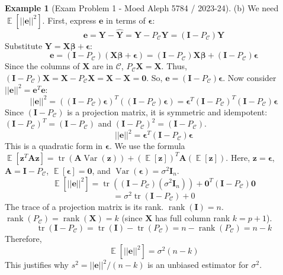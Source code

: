 \documentclass[11pt]{article}
\theoremstyle{definition}
\newtheorem{example}[theorem]{Example}
\theoremstyle{remark}
\DeclareMathOperator{\E}{\mathbb{E}}
\DeclareMathOperator{\Var}{\operatorname{Var}}
\DeclareMathOperator{\tr}{\operatorname{tr}}
\DeclareMathOperator{\rank}{\operatorname{rank}}
\begin{document}
\begin{example}[Exam Problem 1 - Moed Aleph 5784 / 2023-24]
(b) We need $\E[||\bm{e}||^2]$. First, express $\bm{e}$ in terms of $\bm{\epsilon}$:
\[ \bm{e} = \bm{Y} - \hat{\bm{Y}} = \bm{Y} - P_{\mathcal{C}}\bm{Y} = (\bm{I} - P_{\mathcal{C}})\bm{Y} \]
Substitute $\bm{Y} = \bm{X}\bm{\beta} + \bm{\epsilon}$:
\[ \bm{e} = (\bm{I} - P_{\mathcal{C}})(\bm{X}\bm{\beta} + \bm{\epsilon}) = (\bm{I} - P_{\mathcal{C}})\bm{X}\bm{\beta} + (\bm{I} - P_{\mathcal{C}})\bm{\epsilon} \]
Since the columns of $\bm{X}$ are in $\mathcal{C}$, $P_{\mathcal{C}}\bm{X} = \bm{X}$. Thus, $(\bm{I} - P_{\mathcal{C}})\bm{X} = \bm{X} - P_{\mathcal{C}}\bm{X} = \bm{X} - \bm{X} = \mathbf{0}$.
So, $\bm{e} = (\bm{I} - P_{\mathcal{C}})\bm{\epsilon}$.
Now consider $||\bm{e}||^2 = \bm{e}^T\bm{e}$:
\[ ||\bm{e}||^2 = ((\bm{I} - P_{\mathcal{C}})\bm{\epsilon})^T ((\bm{I} - P_{\mathcal{C}})\bm{\epsilon}) = \bm{\epsilon}^T (\bm{I} - P_{\mathcal{C}})^T (\bm{I} - P_{\mathcal{C}}) \bm{\epsilon} \]
Since $(\bm{I} - P_{\mathcal{C}})$ is a projection matrix, it is symmetric and idempotent: $(\bm{I} - P_{\mathcal{C}})^T = (\bm{I} - P_{\mathcal{C}})$ and $(\bm{I} - P_{\mathcal{C}})^2 = (\bm{I} - P_{\mathcal{C}})$.
\[ ||\bm{e}||^2 = \bm{\epsilon}^T (\bm{I} - P_{\mathcal{C}}) \bm{\epsilon} \]
This is a quadratic form in $\bm{\epsilon}$. We use the formula $\E[\bm{z}^T \bm{A} \bm{z}] = \tr(\bm{A} \Var(\bm{z})) + (\E[\bm{z}])^T \bm{A} (\E[\bm{z}])$.
Here, $\bm{z} = \bm{\epsilon}$, $\bm{A} = \bm{I} - P_{\mathcal{C}}$, $\E[\bm{\epsilon}] = \mathbf{0}$, and $\Var(\bm{\epsilon}) = \sigma^2 \bm{I}_n$.
\[ \E[||\bm{e}||^2] = \tr((\bm{I} - P_{\mathcal{C}}) (\sigma^2 \bm{I}_n)) + \mathbf{0}^T (\bm{I} - P_{\mathcal{C}}) \mathbf{0} \]
\[ = \sigma^2 \tr(\bm{I} - P_{\mathcal{C}}) + 0 \]
The trace of a projection matrix is its rank. $\rank(\bm{I}) = n$. $\rank(P_{\mathcal{C}}) = \rank(\bm{X}) = k$ (since $\bm{X}$ has full column rank $k=p+1$).
\[ \tr(\bm{I} - P_{\mathcal{C}}) = \tr(\bm{I}) - \tr(P_{\mathcal{C}}) = n - \rank(P_{\mathcal{C}}) = n - k \]
Therefore,
\[ \E[||\bm{e}||^2] = \sigma^2 (n - k) \]
This justifies why $s^2 = ||\bm{e}||^2 / (n-k)$ is an unbiased estimator for $\sigma^2$.


\end{example}
\end{document}
